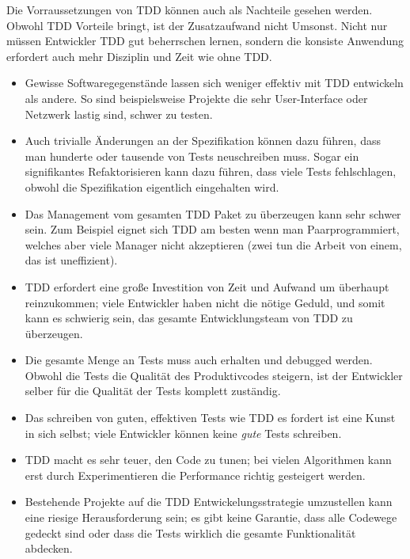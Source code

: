 \documentclass[a4paper,10pt]{scrartcl}
\begin{document}
Die Vorraussetzungen von TDD können auch als Nachteile gesehen werden.
Obwohl TDD Vorteile bringt, ist der Zusatzaufwand nicht Umsonst. Nicht nur
müssen Entwickler TDD gut beherrschen lernen, sondern die konsiste Anwendung
erfordert auch mehr Disziplin und Zeit wie ohne TDD.

\begin{itemize}
    \item Gewisse Softwaregegenstände lassen sich weniger effektiv mit TDD
        entwickeln als andere. So sind beispielsweise Projekte die sehr
        User-Interface oder Netzwerk lastig sind, schwer zu testen.
    \item Auch trivialle Änderungen an der Spezifikation können dazu führen,
        dass man hunderte oder tausende von Tests neuschreiben muss. Sogar
        ein signifikantes Refaktorisieren kann dazu führen, dass viele Tests
        fehlschlagen, obwohl die Spezifikation eigentlich eingehalten wird.
        \cite{StackExchange}
    \item Das Management vom gesamten TDD Paket zu überzeugen kann sehr
        schwer sein. Zum Beispiel eignet sich TDD am besten wenn man
        Paarprogrammiert, welches aber viele Manager nicht akzeptieren (zwei
        tun die Arbeit von einem, das ist uneffizient). \cite{StackOverflow}
    \item TDD erfordert eine große Investition von Zeit und Aufwand um
        überhaupt reinzukommen; viele Entwickler haben nicht die nötige Geduld,
        und somit kann es schwierig sein, das gesamte Entwicklungsteam von TDD
        zu überzeugen. \cite{StackOverflow}
    \item Die gesamte Menge an Tests muss auch erhalten und debugged werden.
        Obwohl die Tests die Qualität des Produktivcodes steigern, ist der
        Entwickler selber für die Qualität der Tests komplett zuständig.
    \item Das schreiben von guten, effektiven Tests wie TDD es fordert ist
        eine Kunst in sich selbst; viele Entwickler können keine \emph{gute}
        Tests schreiben. \cite{StackOverflow}
    \item TDD macht es sehr teuer, den Code zu tunen; bei vielen Algorithmen
        kann erst durch Experimentieren die Performance richtig gesteigert werden.
        \cite{StackOverflow}
    \item Bestehende Projekte auf die TDD Entwickelungsstrategie umzustellen
        kann eine riesige Herausforderung sein; es gibt keine Garantie, dass
        alle Codewege gedeckt sind oder dass die Tests wirklich die gesamte
        Funktionalität abdecken.
\end{itemize}
\end{document}
